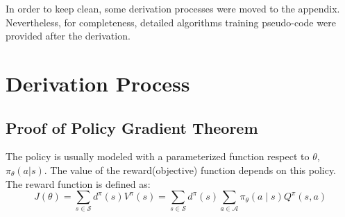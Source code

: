 \begin{appendices}
In order to keep clean, some derivation processes were moved to the appendix. Nevertheless, for completeness, detailed algorithms training pseudo-code were provided after the derivation.
	\chapter{Derivation Process} \label{appendices-derivation-process}
	\section{Proof of Policy Gradient Theorem} \label{derivation-process-gradient-pg}
	The policy is usually modeled with a parameterized function respect to $\theta$, $\pi_{\theta}(a|s)$. The value of the reward(objective) function depends on this policy. The reward function is defined as:
	\begin{equation}
	J(\theta)=\sum_{s \in \mathcal{S}} d^{\pi}(s) V^{\pi}(s)=\sum_{s \in \mathcal{S}} d^{\pi}(s) \sum_{a \in \mathcal{A}} \pi_{\theta}(a \mid s) Q^{\pi}(s, a)
\end{equation}


\end{appendices}
